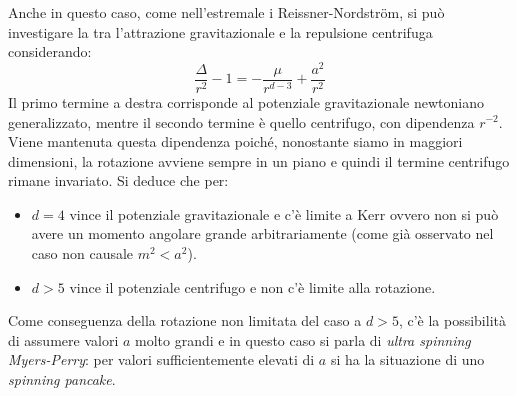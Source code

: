 Anche in questo caso, come nell'estremale i Reissner-Nordstr\"om, si può investigare la  tra l'attrazione gravitazionale e la repulsione centrifuga considerando:
\begin{equation*}
    \frac{\Delta}{r^2} -1 = - \frac{\mu}{r^{d-3}}+ \frac{a^2}{r^2}
\end{equation*}
Il primo termine a destra corrisponde al potenziale gravitazionale newtoniano generalizzato, mentre il secondo termine è quello centrifugo, con dipendenza $r^{-2}$. Viene mantenuta questa dipendenza poiché, nonostante siamo in maggiori dimensioni, la rotazione avviene sempre in un piano e quindi il termine centrifugo rimane invariato. Si deduce che per:
\begin{itemize}
    \item $d=4$ vince il potenziale gravitazionale e c'è limite a Kerr ovvero non si può avere un momento angolare grande arbitrariamente (come già osservato nel caso non causale $m^2 < a^2$).
    \item $d >5$ vince il potenziale centrifugo e non c'è limite alla rotazione.
\end{itemize}
Come conseguenza della rotazione non limitata del caso a $d>5$, c'è la possibilità di assumere valori $a$ molto grandi e in questo caso si parla di \textit{ultra spinning Myers-Perry}: per valori sufficientemente elevati di $a$ si ha la situazione di uno \textit{spinning pancake}.

